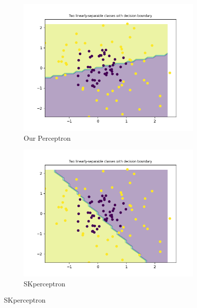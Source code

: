     \begin{figure}[ht]
        \centering
        \begin{subfigure}{0.4\textwidth}
            \centering
            \includegraphics[width=\linewidth]{code/plots/our_perceptron_LR0.001_ITER1_dataset_load_non_linearly_separable_data}
            \caption{Our Perceptron}
            \label{fig:image1}
        \end{subfigure}
        \hspace{2cm} %
        \begin{subfigure}{0.4\textwidth}
            \centering
            \includegraphics[width=\linewidth]{code/plots/SKperceptron_LR0.001_ITER1_dataset_load_non_linearly_separable_data}
            \caption{SKperceptron}
            \label{fig:image2}
        \end{subfigure}
        \label{fig:overall}
    \end{figure}

